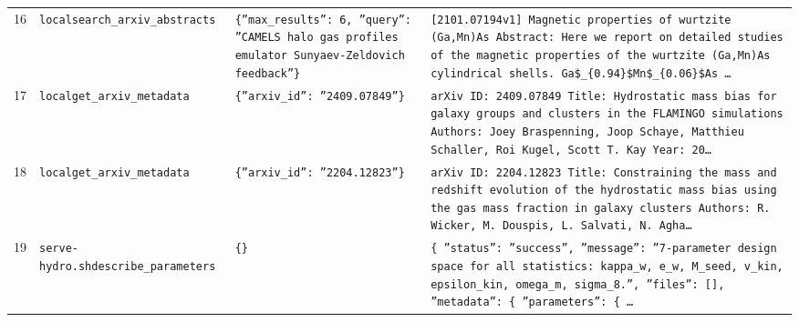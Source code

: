 \documentclass[11pt,a4paper]{article}
\begin{document}
\begin{longtable}{@{}p{}p{}p{}p{}@{}}
16 & \texttt{local}\newline\texttt{search\_\allowbreak{}arxiv\_\allowbreak{}abstracts} & \texttt{\{''max\_\allowbreak{}results'':\allowbreak{} 6,\allowbreak{} ''query'':\allowbreak{} ''CAMELS halo gas profiles emulator Sunyaev-Zeldovich feedback''\}\allowbreak{}} & \texttt{[2101.07194v1]\allowbreak{} Magnetic properties of wurtzite (Ga,\allowbreak{}Mn)\allowbreak{}As Abstract:\allowbreak{} Here we report on detailed studies of the magnetic properties of the wurtzite (Ga,\allowbreak{}Mn)\allowbreak{}As cylindrical shells. Ga\$\_\allowbreak{}\{0.94\}\allowbreak{}\$Mn\$\_\allowbreak{}\{0.06\}\allowbreak{}\$As \ldots{}\allowbreak{}} \\
17 & \texttt{local}\newline\texttt{get\_\allowbreak{}arxiv\_\allowbreak{}metadata} & \texttt{\{''arxiv\_\allowbreak{}id'':\allowbreak{} ''2409.07849''\}\allowbreak{}} & \texttt{arXiv ID:\allowbreak{} 2409.07849 Title:\allowbreak{} Hydrostatic mass bias for galaxy groups and clusters in the FLAMINGO simulations Authors:\allowbreak{} Joey Braspenning,\allowbreak{} Joop Schaye,\allowbreak{} Matthieu Schaller,\allowbreak{} Roi Kugel,\allowbreak{} Scott T. Kay Year:\allowbreak{} 20\ldots{}\allowbreak{}} \\
18 & \texttt{local}\newline\texttt{get\_\allowbreak{}arxiv\_\allowbreak{}metadata} & \texttt{\{''arxiv\_\allowbreak{}id'':\allowbreak{} ''2204.12823''\}\allowbreak{}} & \texttt{arXiv ID:\allowbreak{} 2204.12823 Title:\allowbreak{} Constraining the mass and redshift evolution of the hydrostatic mass bias using the gas mass fraction in galaxy clusters Authors:\allowbreak{} R. Wicker,\allowbreak{} M. Douspis,\allowbreak{} L. Salvati,\allowbreak{} N. Agha\ldots{}\allowbreak{}} \\
19 & \texttt{serve-hydro.sh}\newline\texttt{describe\_\allowbreak{}parameters} & \texttt{\{\}\allowbreak{}} & \texttt{\{   ''status'':\allowbreak{} ''success'',\allowbreak{}   ''message'':\allowbreak{} ''7-parameter design space for all statistics:\allowbreak{} kappa\_\allowbreak{}w,\allowbreak{} e\_\allowbreak{}w,\allowbreak{} M\_\allowbreak{}seed,\allowbreak{} v\_\allowbreak{}kin,\allowbreak{} epsilon\_\allowbreak{}kin,\allowbreak{} omega\_\allowbreak{}m,\allowbreak{} sigma\_\allowbreak{}8.'',\allowbreak{}   ''files'':\allowbreak{} []\allowbreak{},\allowbreak{}   ''metadata'':\allowbreak{} \{     ''parameters'':\allowbreak{} \{    \ldots{}\allowbreak{}} \\

\end{longtable}
\end{document}
